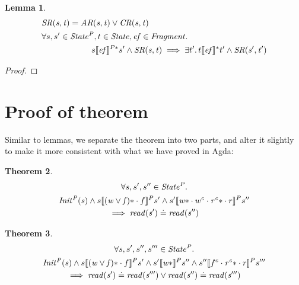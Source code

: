 \documentclass[a4paper,11pt]{article}
\newtheorem{theorem}{Theorem}[section]
\newtheorem{lemma}[theorem]{Lemma}
\theoremstyle{definition}
\begin{document}
\begin{lemma}
	\begin{align*}
		&\mathit{SR(s, t)} = \mathit{AR(s, t)} \lor \mathit{CR(s, t)}\\
		&\forall s, s' \in \mathit{State^P}, t \in \mathit{State}, \mathit{ef} \in \mathit{Fragment} \ldotp\\
		&\qquad \qquad \qquad s \llbracket \mathit{ef} \rrbracket^{P*} s'  \land \mathit{SR(s, t)} \implies \exists t' \ldotp t\llbracket \mathit{ef} \rrbracket^* t' \land \mathit{SR(s', t')} \\
	\end{align*}
\end{lemma}
\begin{proof}
\end{proof}

\section{Proof of theorem}

Similar to lemmas, we separate the theorem into two parts, and alter it slightly to make it more consistent with what we have proved in Agda:

\begin{theorem}
\begin{multline*}
      \forall s, s', s'' \in \mathit{State^P} \ldotp\\\mathit{Init^P(s)} \land s \llbracket \mathit{(w \lor f)\ast} \cdot f \rrbracket^P s' \land s' \llbracket \mathit{w\ast} \cdot w^c \cdot \mathit{r^c\ast} \cdot r \rrbracket^P s'' \\ \implies \mathit{read(s')} \doteq \mathit{read(s'')}
\end{multline*}
\end{theorem}

\begin{theorem}
\begin{multline*}
      \forall s, s', s'', s''' \in \mathit{State^P} \ldotp\\\mathit{Init^P(s)} \land s \llbracket \mathit{(w \lor f)\ast} \cdot f \rrbracket^P s' \land
      s' \llbracket \mathit{w\ast} \rrbracket^P s'' \land
      s'' \llbracket f^c \cdot \mathit{r^c\ast} \cdot r \rrbracket^P s'''\\
      \implies \mathit{read(s')} \doteq \mathit{read(s''')} \lor \mathit{read(s'')} \doteq \mathit{read(s''')}
\end{multline*}
\end{theorem}
\end{document}

